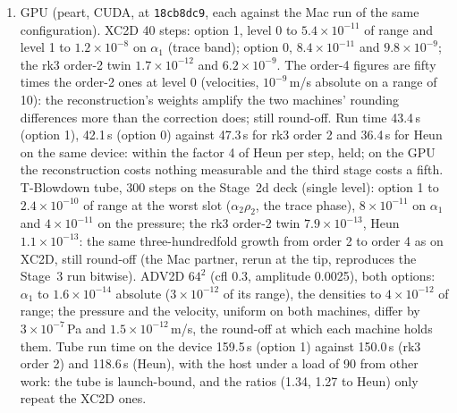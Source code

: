\documentclass[11pt,a4paper]{article}
\newcommand{\code}[1]{\texttt{\small #1}}
\begin{document}
\begin{enumerate}[nosep]
      8.18\,s for rk3 order 2 and 7.40\,s for Heun.
\item GPU (peart, CUDA, at \code{18cb8dc9}, each against the Mac run of
      the same configuration).  XC2D 40 steps: option 1, level 0 to
      $5.4\times10^{-11}$ of range and level 1 to $1.2\times10^{-8}$ on
      $\alpha_1$ (trace band); option 0, $8.4\times10^{-11}$ and
      $9.8\times10^{-9}$; the rk3 order-2 twin $1.7\times10^{-12}$ and
      $6.2\times10^{-9}$.  The order-4 figures are fifty times the
      order-2 ones at level 0 (velocities, $10^{-9}$\,m/s absolute on a
      range of 10): the reconstruction's weights amplify the two
      machines' rounding differences more than the correction does;
      still round-off.  Run time 43.4\,s (option 1), 42.1\,s (option 0)
      against 47.3\,s for rk3 order 2 and 36.4\,s for Heun on the same
      device: within the factor 4 of Heun per step, held; on the GPU the
      reconstruction costs nothing measurable and the third stage costs
      a fifth.  T-Blowdown tube, 300 steps on the Stage~2d deck (single
      level): option 1 to $2.4\times10^{-10}$ of range at the worst slot
      ($\alpha_2\rho_2$, the trace phase), $8\times10^{-11}$ on
      $\alpha_1$ and $4\times10^{-11}$ on the pressure; the rk3 order-2
      twin $7.9\times10^{-13}$, Heun $1.1\times10^{-13}$: the same
      three-hundredfold growth from order 2 to order 4 as on XC2D, still
      round-off (the Mac partner, rerun at the tip, reproduces the
      Stage~3 run bitwise).  ADV2D $64^2$ (cfl 0.3, amplitude 0.0025),
      both options: $\alpha_1$ to $1.6\times10^{-14}$ absolute
      ($3\times10^{-12}$ of its range), the densities to
      $4\times10^{-12}$ of range; the pressure and the velocity, uniform
      on both machines, differ by $3\times10^{-7}$\,Pa and
      $1.5\times10^{-12}$\,m/s, the round-off at which each machine holds
      them.  Tube run time on the device 159.5\,s (option 1) against
      150.0\,s (rk3 order 2) and 118.6\,s (Heun), with the host under a
      load of 90 from other work: the tube is launch-bound, and the
      ratios (1.34, 1.27 to Heun) only repeat the XC2D ones.
\end{enumerate}
\end{document}
